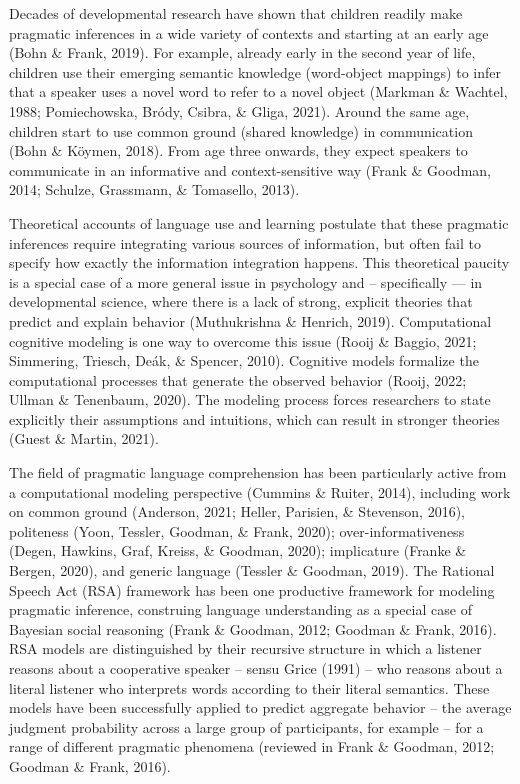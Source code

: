 \documentclass[
  man,floatsintext]{apa6}
\begin{document}
Decades of developmental research have shown that children readily make pragmatic inferences in a wide variety of contexts and starting at an early age (Bohn \& Frank, 2019). For example, already early in the second year of life, children use their emerging semantic knowledge (word-object mappings) to infer that a speaker uses a novel word to refer to a novel object (Markman \& Wachtel, 1988; Pomiechowska, Bródy, Csibra, \& Gliga, 2021). Around the same age, children start to use common ground (shared knowledge) in communication (Bohn \& Köymen, 2018). From age three onwards, they expect speakers to communicate in an informative and context-sensitive way (Frank \& Goodman, 2014; Schulze, Grassmann, \& Tomasello, 2013).

Theoretical accounts of language use and learning postulate that these pragmatic inferences require integrating various sources of information, but often fail to specify how exactly the information integration happens. This theoretical paucity is a special case of a more general issue in psychology and -- specifically --- in developmental science, where there is a lack of strong, explicit theories that predict and explain behavior (Muthukrishna \& Henrich, 2019). Computational cognitive modeling is one way to overcome this issue (Rooij \& Baggio, 2021; Simmering, Triesch, Deák, \& Spencer, 2010). Cognitive models formalize the computational processes that generate the observed behavior (Rooij, 2022; Ullman \& Tenenbaum, 2020). The modeling process forces researchers to state explicitly their assumptions and intuitions, which can result in stronger theories (Guest \& Martin, 2021).

The field of pragmatic language comprehension has been particularly active from a computational modeling perspective (Cummins \& Ruiter, 2014), including work on common ground (Anderson, 2021; Heller, Parisien, \& Stevenson, 2016), politeness (Yoon, Tessler, Goodman, \& Frank, 2020); over-informativeness (Degen, Hawkins, Graf, Kreiss, \& Goodman, 2020); implicature (Franke \& Bergen, 2020), and generic language (Tessler \& Goodman, 2019). The Rational Speech Act (RSA) framework has been one productive framework for modeling pragmatic inference, construing language understanding as a special case of Bayesian social reasoning (Frank \& Goodman, 2012; Goodman \& Frank, 2016). RSA models are distinguished by their recursive structure in which a listener reasons about a cooperative speaker -- sensu Grice (1991) -- who reasons about a literal listener who interprets words according to their literal semantics. These models have been successfully applied to predict aggregate behavior -- the average judgment probability across a large group of participants, for example -- for a range of different pragmatic phenomena (reviewed in Frank \& Goodman, 2012; Goodman \& Frank, 2016).
\end{document}
